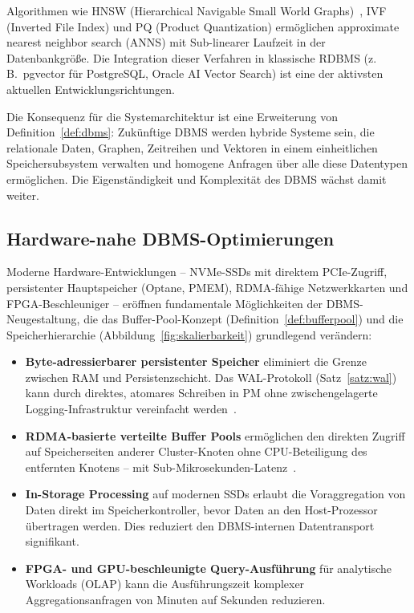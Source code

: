 ﻿\documentclass[a4paper,12pt]{article}
\theoremstyle{definition}
\begin{document}
Algorithmen wie HNSW (Hierarchical Navigable Small World Graphs)~\cite{malkov2018hnsw}, IVF (Inverted File Index) und PQ (Product Quantization) ermöglichen approximate nearest neighbor search (ANNS) mit Sub-linearer Laufzeit in der Datenbankgröße. Die Integration dieser Verfahren in klassische RDBMS (z.\,B.\ pgvector für PostgreSQL, Oracle AI Vector Search) ist eine der aktivsten aktuellen Entwicklungsrichtungen.

Die Konsequenz für die Systemarchitektur ist eine Erweiterung von Definition~\ref{def:dbms}: Zukünftige DBMS werden hybride Systeme sein, die relationale Daten, Graphen, Zeitreihen und Vektoren in einem einheitlichen Speichersubsystem verwalten und homogene Anfragen über alle diese Datentypen ermöglichen. Die Eigenständigkeit und Komplexität des DBMS wächst damit weiter.

\subsection{Hardware-nahe DBMS-Optimierungen}

Moderne Hardware-Entwicklungen -- NVMe-SSDs mit direktem PCIe-Zugriff, persistenter Hauptspeicher (Optane, PMEM), RDMA-fähige Netzwerkkarten und FPGA-Beschleuniger -- eröffnen fundamentale Möglichkeiten der DBMS-Neugestaltung, die das Buffer-Pool-Konzept (Definition~\ref{def:bufferpool}) und die Speicherhierarchie (Abbildung~\ref{fig:skalierbarkeit}) grundlegend verändern:

\begin{itemize}
	\item \textbf{Byte-adressierbarer persistenter Speicher} eliminiert die Grenze zwischen RAM und Persistenzschicht. Das WAL-Protokoll (Satz~\ref{satz:wal}) kann durch direktes, atomares Schreiben in PM ohne zwischengelagerte Logging-Infrastruktur vereinfacht werden~\cite{oukid2017wort}.
	\item \textbf{RDMA-basierte verteilte Buffer Pools} ermöglichen den direkten Zugriff auf Speicherseiten anderer Cluster-Knoten ohne CPU-Beteiligung des entfernten Knotens -- mit Sub-Mikrosekunden-Latenz~\cite{wei2015fast}.
	\item \textbf{In-Storage Processing} auf modernen SSDs erlaubt die Voraggregation von Daten direkt im Speicherkontroller, bevor Daten an den Host-Prozessor übertragen werden. Dies reduziert den DBMS-internen Datentransport signifikant.
	\item \textbf{FPGA- und GPU-beschleunigte Query-Ausführung} für analytische Workloads (OLAP) kann die Ausführungszeit komplexer Aggregationsanfragen von Minuten auf Sekunden reduzieren.
\end{itemize}
\end{document}
